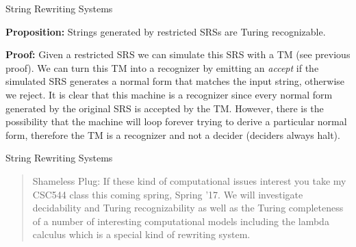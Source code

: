 \documentclass{beamer}
\begin{document}
\begin{frame}[fragile]{String Rewriting Systems}

\scriptsize
{\bf Proposition:} Strings generated by restricted SRSs are Turing recognizable.

{\bf Proof:} Given a restricted SRS we can simulate this SRS with a TM (see previous proof).  We can turn this TM into a recognizer by emitting an
{\em accept} if the simulated SRS generates a normal form that matches the input string, otherwise we reject.  It is clear that this machine is
a recognizer since every normal form generated by the original SRS is accepted by the TM.  However, there is the possibility that the machine
will loop forever trying to derive a particular normal form, therefore the TM is a recognizer and not a decider (deciders always halt).   
\end{frame}

\begin{frame}[fragile]{String Rewriting Systems}
\begin{quote}
Shameless Plug:  If these kind of computational issues interest you take my CSC544 class this coming spring, Spring '17.  We will
investigate decidability and Turing recognizability as well as the Turing completeness of a number of interesting computational models
including the lambda calculus which is a special kind of rewriting system.
\end{quote}
\end{frame}
\end{document}
